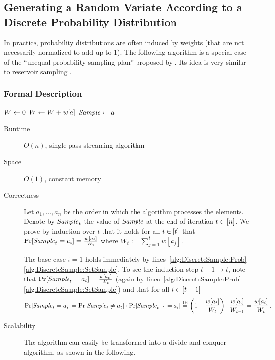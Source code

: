 \subsection{Generating a Random Variate According to a Discrete Probability Distribution}

In practice, probability distributions are often induced by weights (that are not necessarily normalized to add up to 1). The following algorithm is a special case of the ``unequal probability sampling plan'' proposed by \textcite{C82a}. Its idea is very similar to reservoir sampling \cite{MB83a}.

\subsubsection{Formal Description}

\begin{algorithm}[DiscreteSample$(A, w)$] \label{alg:DiscreteSample}
\begin{algorithmic}[1]
	\State $W \leftarrow 0$
		\State $W \leftarrow W + w[a]$ \label{alg:DiscreteSample:UpdateWeight}
		 \label{alg:DiscreteSample:Prob}
			\State $\mathit{Sample} \leftarrow a$ \label{alg:DiscreteSample:SetSample}
		\EndWith
	\EndFor
\end{algorithmic}
\end{algorithm}

\begin{description}
	\item[Runtime] $O(n)$, single-pass streaming algorithm
	\item[Space] $O(1)$, constant memory
	\item[Correctness]
		Let $a_1, \dots, a_n$ be the order in which the algorithm processes the elements. Denote by $\mathit{Sample}_t$ the value of $\mathit{Sample}$ at the end of iteration $t \in \Nupto n$. We prove by induction over $t$ that it holds for all $i \in \Nupto t$ that $\Pr[\mathit{Sample}_t = a_i] = \frac{w[a_i]}{W_t}$ where $W_t := \sum_{j=1}^t w[a_j]$.

		The base case $t = 1$ holds immediately by lines~\ref{alg:DiscreteSample:Prob}--\ref{alg:DiscreteSample:SetSample}. To see the induction step $t - 1 \to t$, note that $\Pr[\mathit{Sample}_t = a_t] = \frac{w[a_t]}{W_t}$ (again by lines~\ref{alg:DiscreteSample:Prob}--\ref{alg:DiscreteSample:SetSample}) and that for all $i \in \Nupto{t-1}$
		\begin{align*}
			\Pr[\Sample_t = a_i]
			=	\Pr[\Sample_t \neq a_t] \cdot \Pr[\Sample_{t-1} = a_i]
			\stackrel{\text{IH}}{=}
				\left(1 - \frac{w[a_t]}{W_t}\right) \cdot \frac{w[a_i]}{W_{t-1}}
			=	\frac{w[a_i]}{W_t}
			\SiM.
		\end{align*}
	\item[Scalability]
		The algorithm can easily be transformed into a divide-and-conquer algorithm, as shown in the following.
\end{description}

